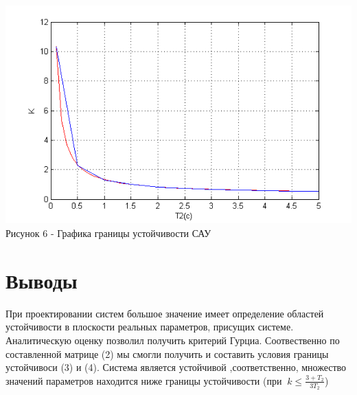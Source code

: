 \documentclass[a4paper, 11pt]{article}
\begin{document}
\begin{center}
		\includegraphics[width=0.7\linewidth]{4}
		\\
	\centering  Рисунок 6 - Графика границы устойчивости САУ

	
\end{center}

\newpage
\section*{Выводы}
При проектировании систем большое значение имеет определение областей устойчивости в плоскости реальных параметров, присущих системе. Аналитическую оценку позволил получить критерий Гурциа. Соотвественно по составленной матрице (2) мы смогли получить и составить условия границы устойчивоси (3) и (4). Система является устойчивой ,соответственно, множество значений параметров находится ниже границы устойчивости (при %
$\ k \le \frac{{3 + {T_2}}}{{3{T_2}}}$)
\end{document}
